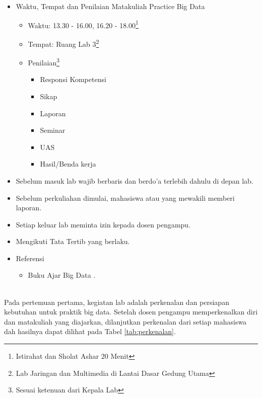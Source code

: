 \documentclass[a4paper]{tufte-handout}
\begin{document}
\begin{maybe}
    \begin{itemize}
    	\item Waktu, Tempat dan Penilaian Matakuliah Practice Big Data
    	\begin{itemize}
    	\item Waktu: 13.30 - 16.00, 16.20 - 18.00\footnote{Istirahat dan Sholat Ashar 20 Menit}
    	\item Tempat: Ruang Lab 3\footnote{Lab Jaringan dan Multimedia di Lantai Dasar Gedung Utama}
    	\item Penilaian\footnote{Sesuai ketenuan dari Kepala Lab}
    	\begin{itemize}
    	\item Responsi Kompetensi
    	\item Sikap
    	\item Laporan
    	\item Seminar
    	\item UAS
    	\item Hasil/Benda kerja
    	\end{itemize}
    	\end{itemize}
    	\item Sebelum masuk lab wajib berbaris dan berdo'a terlebih dahulu di depan lab.
    	\item Sebelum perkuliahan dimulai, mahasiswa atau yang mewakili memberi laporan.
    	\item Setiap keluar lab meminta izin kepada dosen pengampu.
    	\item Mengikuti Tata Tertib yang berlaku.
    	\item Referensi
    	\begin{itemize}
    		\item Buku Ajar Big Data \citep{Mursyidah2020}.
    	\end{itemize}
    \end{itemize}
\end{maybe}

\clearpage
{}

 \\
Pada pertemuan pertama, kegiatan lab adalah perkenalan dan persiapan kebutuhan untuk praktik big data. Setelah dosen pengampu memperkenalkan diri dan matakuliah yang diajarkan, dilanjutkan perkenalan dari setiap mahasiswa dah hasilnya dapat dilihat pada Tabel \ref{tab:perkenalan}.
\end{document}

